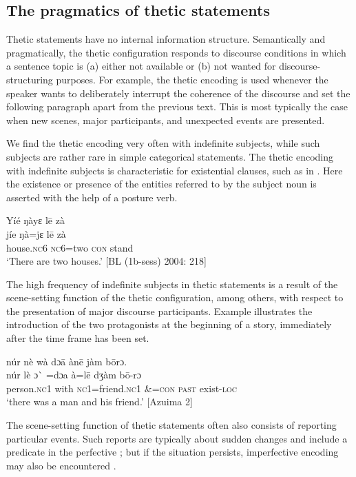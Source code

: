 \documentclass[output=paper]{langsci/langscibook}
\begin{document}
\subsection{The pragmatics of thetic statements}\label{sec:schwarz:3.4}

Thetic statements have no internal information structure. Semantically and pragmatically, the thetic configuration responds to discourse conditions in which a sentence topic is (a) either not available or (b) not wanted for discourse-structuring purposes. For example, the thetic encoding is used whenever the speaker wants to deliberately interrupt the coherence of the discourse and set the following paragraph apart from the previous text. This is most typically the case when new scenes, major participants, and unexpected events are presented. 

We find the thetic encoding very often with indefinite subjects, while such subjects are rather rare in simple categorical statements. The thetic encoding with indefinite subjects is characteristic for existential clauses, such as in . Here the existence or presence of the entities referred to by the subject noun is asserted with the help of a posture verb.

\ea\label{ex:schwarz:20}
\glll   Yíé    ŋàyɛ    l\={e}  zà\\
    \textup{jíe}    ŋà=jɛ    l\={e}  {zà} \\
       house.\textsc{nc}6  \textsc{nc}6=two  \textsc{con}  stand\\
\glt ‘There are two houses.’ [BL (1b-sess) 2004: 218]
\z

The high frequency of indefinite subjects in thetic statements is a result of the scene-setting function of the thetic configuration, among others, with respect to the presentation of major discourse participants. Example  illustrates the introduction of the two protagonists at the beginning of a story, immediately after the time frame has been set. 

\ea\label{ex:schwarz:21}
\glll   núr    nè  wà   dɔ\={a}    àn\={e}    jàm  b\={o}rɔ.\\
    \textup{núr    lè } ɔ\`{} \textup{=dɔa      à=l\={e}    dʒàm  b\={o}-rɔ}\\
       person.\textsc{nc}1  with  \textsc{nc}1=friend.\textsc{nc}1  \&=\textsc{con}  \textsc{past}  exist-\textsc{loc}\\
\glt ‘there was a man and his friend.’ [Azuima 2]
\z

The scene-setting function of thetic statements often also consists of reporting particular events. Such reports are typically about sudden changes and include a predicate in the perfective ; but if the situation persists, imperfective encoding may also be encountered .
\end{document}
